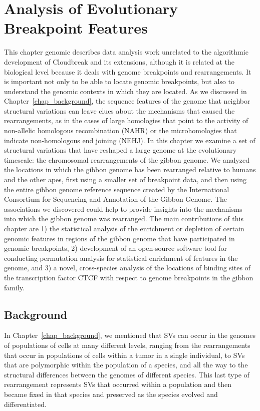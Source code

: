 \chapter{Analysis of Evolutionary Breakpoint Features}
\label{chap_breakpoint_analysis}

This chapter genomic describes data analysis work unrelated to the algorithmic development of Cloudbreak and its extensions, although it is related at the biological level because it deals with genome breakpoints and rearrangements. It is important not only to be able to locate genomic breakpoints, but also to understand the genomic contexts in which they are located. As we discussed in Chapter~\ref{chap_background}, the sequence features of the genome that neighbor structural variations can leave clues about the mechanisms that caused the rearrangements, as in the cases of large homologies that point to the activity of non-allelic homologous recombination (NAHR) or the microhomologies that indicate non-homologous end joining (NEHJ). In this chapter we examine a set of structural variations that have reshaped a large genome at the evolutionary timescale: the chromosomal rearrangements of the gibbon genome. We analyzed the locations in which the gibbon genome has been rearranged relative to humans and the other apes, first using a smaller set of breakpoint data, and then using the entire gibbon genome reference sequence created by the International Consortium for Sequencing and Annotation of the Gibbon Genome. The associations we discovered could help to provide insights into the mechanisms into which the gibbon genome was rearranged.  The main contributions of this chapter are 1) the statistical analysis of the enrichment or depletion of certain genomic features in regions of the gibbon genome that have participated in genomic breakpoints, 2) development of an open-source software tool for conducting permutation analysis for statistical enrichment of features in the genome, and 3) a novel, cross-species analysis of the locations of binding sites of the transcription factor CTCF with respect to genome breakpoints in the gibbon family.

\section{Background}

In Chapter~\ref{chap_background}, we mentioned that SVs can occur in the genomes of populations of cells at many different levels, ranging from the rearrangements that occur in populations of cells within a tumor in a single individual, to SVs that are polymorphic within the population of a species, and all the way to the structural differences between the genomes of different species. This last type of rearrangement represents SVs that occurred within a population and then became fixed in that species and preserved as the species evolved and differentiated. 

